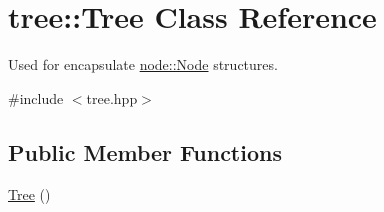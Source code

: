\hypertarget{classtree_1_1Tree}{\section{tree\-:\-:Tree Class Reference}
\label{classtree_1_1Tree}
}


Used for encapsulate \hyperlink{classnode_1_1Node}{node\-::\-Node} structures.  




{\ttfamily \#include $<$tree.\-hpp$>$}

\subsection*{Public Member Functions}
\begin{DoxyCompactItemize}
\item 
\hypertarget{classtree_1_1Tree_a66755a8dbcf714aa93e63952bdb62484}{\hyperlink{classtree_1_1Tree_a66755a8dbcf714aa93e63952bdb62484}{Tree} ()}\label{classtree_1_1Tree_a66755a8dbcf714aa93e63952bdb62484}


\end{DoxyCompactItemize}
